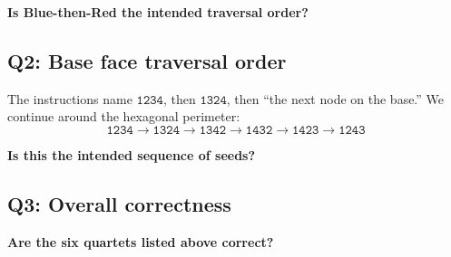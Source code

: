 \documentclass[11pt]{article}
\newcommand{\perm}[1]{\mathtt{#1}}
\begin{document}
\textbf{Is Blue-then-Red the intended traversal order?}

\subsection{Q2: Base face traversal order}

The instructions name $\perm{1234}$, then $\perm{1324}$, then
``the next node on the base.''  We continue around the hexagonal
perimeter:
\[
  \perm{1234} \to \perm{1324} \to \perm{1342} \to
  \perm{1432} \to \perm{1423} \to \perm{1243}
\]

\textbf{Is this the intended sequence of seeds?}

\subsection{Q3: Overall correctness}

\textbf{Are the six quartets listed above correct?}
\end{document}
